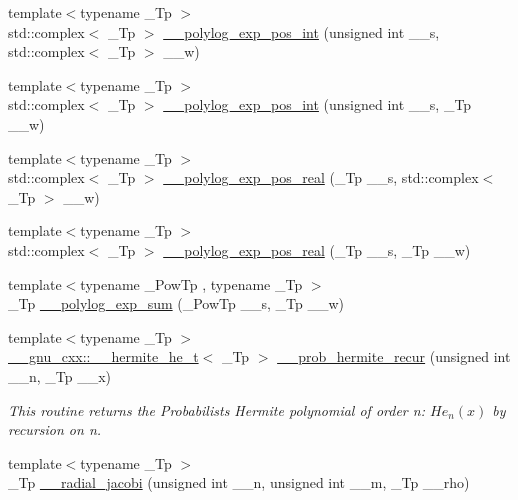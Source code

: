 \begin{DoxyCompactItemize}
\item 
{\footnotesize template$<$typename \+\_\+\+Tp $>$ }\\std\+::complex$<$ \+\_\+\+Tp $>$ \hyperlink{namespacestd_1_1____detail_a84081b0dd494f4601f2d40768e71b7b4}{\+\_\+\+\_\+polylog\+\_\+exp\+\_\+pos\+\_\+int} (unsigned int \+\_\+\+\_\+s, std\+::complex$<$ \+\_\+\+Tp $>$ \+\_\+\+\_\+w)
\item 
{\footnotesize template$<$typename \+\_\+\+Tp $>$ }\\std\+::complex$<$ \+\_\+\+Tp $>$ \hyperlink{namespacestd_1_1____detail_a6d05f9213f03b1781250cc048739e55b}{\+\_\+\+\_\+polylog\+\_\+exp\+\_\+pos\+\_\+int} (unsigned int \+\_\+\+\_\+s, \+\_\+\+Tp \+\_\+\+\_\+w)
\item 
{\footnotesize template$<$typename \+\_\+\+Tp $>$ }\\std\+::complex$<$ \+\_\+\+Tp $>$ \hyperlink{namespacestd_1_1____detail_a36da38ab2aa8a67c089412937d5a695b}{\+\_\+\+\_\+polylog\+\_\+exp\+\_\+pos\+\_\+real} (\+\_\+\+Tp \+\_\+\+\_\+s, std\+::complex$<$ \+\_\+\+Tp $>$ \+\_\+\+\_\+w)
\item 
{\footnotesize template$<$typename \+\_\+\+Tp $>$ }\\std\+::complex$<$ \+\_\+\+Tp $>$ \hyperlink{namespacestd_1_1____detail_a8a6390a3855283fc27a5d57dd736b62e}{\+\_\+\+\_\+polylog\+\_\+exp\+\_\+pos\+\_\+real} (\+\_\+\+Tp \+\_\+\+\_\+s, \+\_\+\+Tp \+\_\+\+\_\+w)
\item 
{\footnotesize template$<$typename \+\_\+\+Pow\+Tp , typename \+\_\+\+Tp $>$ }\\\+\_\+\+Tp \hyperlink{namespacestd_1_1____detail_acbdb1ad0debb8c919b4dcb1589af734c}{\+\_\+\+\_\+polylog\+\_\+exp\+\_\+sum} (\+\_\+\+Pow\+Tp \+\_\+\+\_\+s, \+\_\+\+Tp \+\_\+\+\_\+w)
\item 
{\footnotesize template$<$typename \+\_\+\+Tp $>$ }\\\hyperlink{struct____gnu__cxx_1_1____hermite__he__t}{\+\_\+\+\_\+gnu\+\_\+cxx\+::\+\_\+\+\_\+hermite\+\_\+he\+\_\+t}$<$ \+\_\+\+Tp $>$ \hyperlink{namespacestd_1_1____detail_a15e668e86c18d01134aded2a1657b1b2}{\+\_\+\+\_\+prob\+\_\+hermite\+\_\+recur} (unsigned int \+\_\+\+\_\+n, \+\_\+\+Tp \+\_\+\+\_\+x)
\begin{DoxyCompactList}\small\item\em This routine returns the Probabilists Hermite polynomial of order n\+: $ He_n(x) $ by recursion on n. \end{DoxyCompactList}\item 
{\footnotesize template$<$typename \+\_\+\+Tp $>$ }\\\+\_\+\+Tp \hyperlink{namespacestd_1_1____detail_a6d85c9848b491999fc80a1cdbd23db66}{\+\_\+\+\_\+radial\+\_\+jacobi} (unsigned int \+\_\+\+\_\+n, unsigned int \+\_\+\+\_\+m, \+\_\+\+Tp \+\_\+\+\_\+rho)

\end{DoxyCompactItemize}
